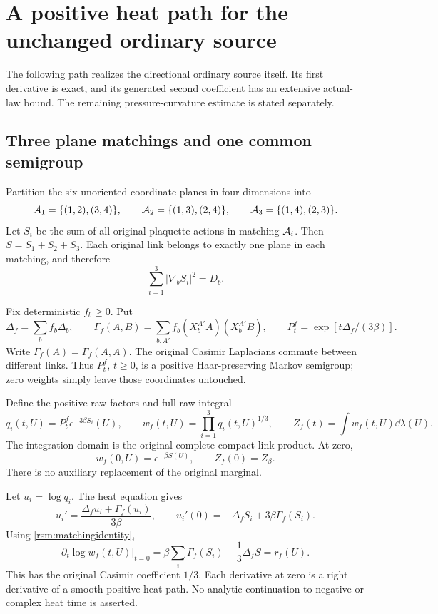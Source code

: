\section{A positive heat path for the unchanged ordinary source}
\label{rsm:heatsection}

The following path realizes the directional ordinary source itself. Its first derivative is exact, and its generated second coefficient has an extensive actual-law bound. The remaining pressure-curvature estimate is stated separately.

\subsection{Three plane matchings and one common semigroup}

Partition the six unoriented coordinate planes in four dimensions into
\[
 {\cal A}_1=\{(1,2),(3,4)\},\qquad
 {\cal A}_2=\{(1,3),(2,4)\},\qquad
 {\cal A}_3=\{(1,4),(2,3)\}.
\]
Let \(S_i\) be the sum of all original plaquette actions in matching \({\cal A}_i\). Then \(S=S_1+S_2+S_3\). Each original link belongs to exactly one plane in each matching, and therefore
\begin{equation}
 \sum_{i=1}^3|\nabla_bS_i|^2=D_b.
 \label{rsm:matchingidentity}
\end{equation}

Fix deterministic \(f_b\ge0\). Put
\[
 \Delta_f=\sum_bf_b\Delta_b,\qquad
 \Gamma_f(A,B)=\sum_{b,A'}f_b(X_b^{A'}A)(X_b^{A'}B),
 \qquad P_t^f=\exp[t\Delta_f/(3\beta)].
\]
Write \(\Gamma_f(A)=\Gamma_f(A,A)\). The original Casimir Laplacians commute between different links. Thus \(P_t^f\), \(t\ge0\), is a positive Haar-preserving Markov semigroup; zero weights simply leave those coordinates untouched.

Define the positive raw factors and full raw integral
\begin{equation}
 q_i(t,U)=P_t^f e^{-3\beta S_i}(U),\qquad
 w_f(t,U)=\prod_{i=1}^3q_i(t,U)^{1/3},\qquad
 Z_f(t)=\int w_f(t,U)\dd\lambda(U).
 \label{rsm:heatpath}
\end{equation}
The integration domain is the original complete compact link product. At zero,
\[
 w_f(0,U)=e^{-\beta S(U)},\qquad Z_f(0)=Z_\beta.
\]
There is no auxiliary replacement of the original marginal.

Let \(u_i=\log q_i\). The heat equation gives
\[
 u_i'=\frac{\Delta_fu_i+\Gamma_f(u_i)}{3\beta},
 \qquad
 u_i'(0)=-\Delta_fS_i+3\beta\Gamma_f(S_i).
\]
Using \eqref{rsm:matchingidentity},
\begin{equation}
 \boxed{\quad
 \left.\partial_t\log w_f(t,U)\right|_{t=0}
 =
 \beta\sum_i\Gamma_f(S_i)-\frac13\Delta_fS
 =r_f(U).
 \quad}
 \label{rsm:ordinaryheatjet}
\end{equation}
This has the original Casimir coefficient \(1/3\). Each derivative at zero is a right derivative of a smooth positive heat path. No analytic continuation to negative or complex heat time is asserted.

